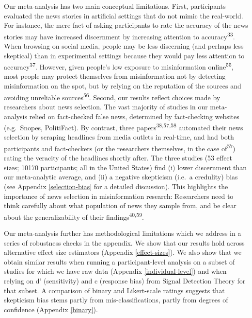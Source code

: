\documentclass[
  man]{apa6}
\begin{document}
Our meta-analysis has two main conceptual limitations. First, participants evaluated the news stories in artificial settings that do not mimic the real-world. For instance, the mere fact of asking participants to rate the accuracy of the news stories may have increased discernment by increasing attention to accuracy\textsuperscript{33}. When browsing on social media, people may be less discerning (and perhaps less skeptical) than in experimental settings because they would pay less attention to accuracy\textsuperscript{37}. However, given people's low exposure to misinformation online\textsuperscript{55}, most people may protect themselves from misinformation not by detecting misinformation on the spot, but by relying on the reputation of the sources and avoiding unreliable sources\textsuperscript{56}. Second, our results reflect choices made by researchers about news selection. The vast majority of studies in our meta-analysis relied on fact-checked false news, determined by fact-checking websites (e.g.~Snopes, PolitiFact). By contrast, three papers\textsuperscript{38,57,58} automated their news selection by scraping headlines from media outlets in real-time, and had both participants and fact-checkers (or the researchers themselves, in the case of\textsuperscript{57}) rating the veracity of the headlines shortly after. The three studies (53 effect sizes; 10170 participants; all in the United States) find (i) lower discernment than our meta-analytic average, and (ii) a negative skepticism (i.e.~a credulity) bias (see Appendix \ref{selection-bias} for a detailed discussion). This highlights the importance of news selection in misinformation research: Researchers need to think carefully about what population of news they sample from, and be clear about the generalizability of their findings\textsuperscript{40,59}.

Our meta-analysis further has methodological limitations which we address in a series of robustness checks in the appendix. We show that our results hold across alternative effect size estimators (Appendix \ref{effect-sizes}). We also show that we obtain similar results when running a participant-level analysis on a subset of studies for which we have raw data (Appendix \ref{individual-level}) and when relying on d' (sensitivity) and c (response bias) from Signal Detection Theory for that subset. A comparison of binary and Likert-scale ratings suggests that skepticism bias stems partly from mis-classifications, partly from degrees of confidence (Appendix \ref{binary}).
\end{document}
